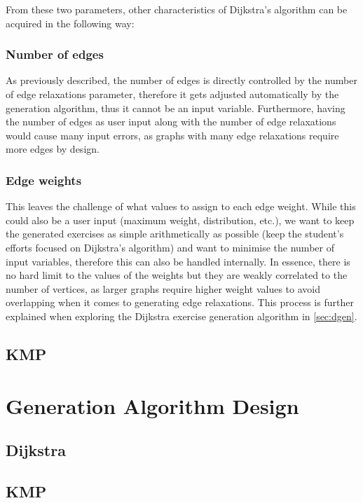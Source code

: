 \documentclass{l4proj}
\begin{document}
From these two parameters, other characteristics of Dijkstra's algorithm can be acquired in the following way:

\subsubsection{Number of edges}

As previously described, the number of edges is directly controlled by the number of edge relaxations parameter, therefore it gets adjusted automatically by the generation algorithm, thus it cannot be an input variable. Furthermore, having the number of edges as user input along with the number of edge relaxations would cause many input errors, as graphs with many edge relaxations require more edges by design. 

\subsubsection{Edge weights}

This leaves the challenge of what values to assign to each edge weight. While this could also be a user input (maximum weight, distribution, etc.), we want to keep the generated exercises as simple arithmetically as possible (keep the student's efforts focused on Dijkstra's algorithm) and want to minimise the number of input variables, therefore this can also be handled internally. In essence, there is no hard limit to the values of the weights but they are weakly correlated to the number of vertices, as larger graphs require higher weight values to avoid overlapping when it comes to generating edge relaxations. This process is further explained when exploring the Dijkstra exercise generation algorithm in \autoref{sec:dgen}.

\subsection{KMP}

\section{Generation Algorithm Design}

\subsection{Dijkstra}
\label{sec:dgen}
\subsection{KMP}
\end{document}
